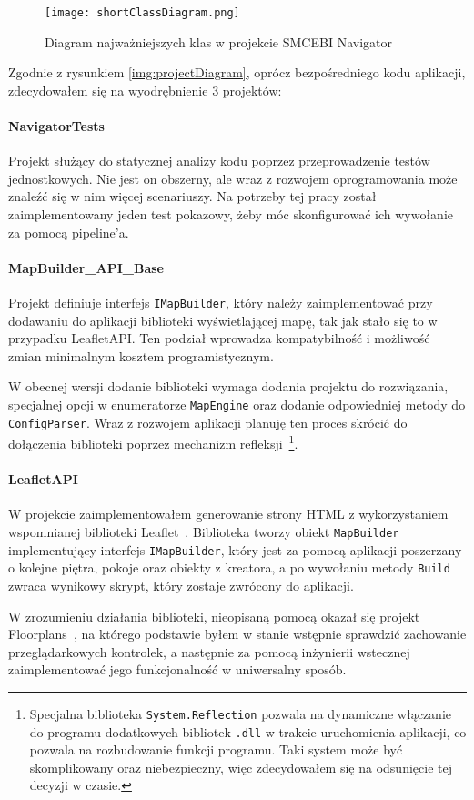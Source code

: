 \begin{figure}[ht]
    \centering
    \texttt{[image: shortClassDiagram.png]}
    \caption{Diagram najważniejszych klas w projekcie SMCEBI Navigator}
    \label{img:shortClassDiagram}
\end{figure}
\newpage


Zgodnie z rysunkiem \ref{img:projectDiagram}, oprócz bezpośredniego kodu aplikacji, 
zdecydowałem się na wyodrębnienie 3 projektów:

\paragraph{NavigatorTests}
Projekt służący do statycznej analizy kodu poprzez przeprowadzenie testów jednostkowych.
Nie jest on obszerny, ale wraz z rozwojem oprogramowania może znaleźć się w nim więcej 
scenariuszy. Na potrzeby tej pracy został zaimplementowany jeden test pokazowy, 
żeby móc skonfigurować ich wywołanie za pomocą pipeline'a.

\paragraph{MapBuilder\_API\_Base}
Projekt definiuje interfejs \verb|IMapBuilder|, który należy zaimplementować przy dodawaniu 
do aplikacji biblioteki wyświetlającej mapę, tak jak stało się to w przypadku LeafletAPI.
Ten podział wprowadza kompatybilność i możliwość zmian minimalnym kosztem programistycznym.

W obecnej wersji dodanie biblioteki wymaga dodania projektu do rozwiązania, specjalnej opcji w enumeratorze 
\verb|MapEngine| oraz dodanie odpowiedniej metody do \verb|ConfigParser|. Wraz z rozwojem aplikacji 
planuję ten proces skrócić do dołączenia biblioteki poprzez mechanizm refleksji~\cprotect\footnote{%
    Specjalna biblioteka \verb|System.Reflection| pozwala na dynamiczne włączanie do programu 
    dodatkowych bibliotek \verb|.dll| w trakcie uruchomienia aplikacji, co pozwala na rozbudowanie 
    funkcji programu. Taki system może być skomplikowany oraz niebezpieczny, więc zdecydowałem się 
    na odsunięcie tej decyzji w czasie.
}.

\paragraph{LeafletAPI}
W projekcie zaimplementowałem generowanie strony HTML z wykorzystaniem wspomnianej biblioteki Leaflet~\cite{leafletGithub}.
Biblioteka tworzy obiekt \verb|MapBuilder| implementujący interfejs \verb|IMapBuilder|, który jest 
za pomocą aplikacji poszerzany o kolejne piętra, pokoje oraz obiekty z kreatora, a po wywołaniu 
metody \verb|Build| zwraca wynikowy skrypt, który zostaje zwrócony do aplikacji.

W zrozumieniu działania biblioteki, nieopisaną pomocą okazał się projekt Floorplans~\cite{floorplansGithub},
na którego podstawie byłem w stanie wstępnie sprawdzić zachowanie przeglądarkowych kontrolek, 
a następnie za pomocą inżynierii wstecznej zaimplementować jego funkcjonalność w uniwersalny sposób.


